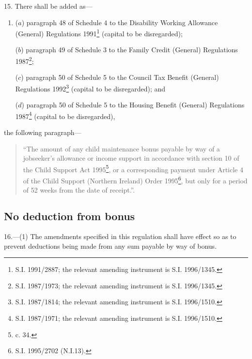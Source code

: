 \documentclass[a4paper]{article}
\begin{document}
15.  There shall be added as—
\begin{enumerate}\item[]
($a$) paragraph 48 of Schedule 4 to the Disability Working Allowance (General) Regulations 1991\footnote{\frenchspacing S.I. 1991/2887; the relevant amending instrument is S.I. 1996/1345.} (capital to be disregarded);

($b$) paragraph 49 of Schedule 3 to the Family Credit (General) Regulations 1987\footnote{\frenchspacing S.I. 1987/1973; the relevant amending instrument is S.I. 1996/1345.};

($c$) paragraph 50 of Schedule 5 to the Council Tax Benefit (General) Regulations 1992\footnote{\frenchspacing S.I. 1987/1814; the relevant amending instrument is S.I. 1996/1510.} (capital to be disregarded); and

($d$) paragraph 50 of Schedule 5 to the Housing Benefit (General) Regulations 1987\footnote{\frenchspacing S.I. 1987/1971; the relevant amending instrument is S.I. 1996/1510.} (capital to be disregarded),
\end{enumerate}
the following paragraph—
\begin{quotation}
“The amount of any child maintenance bonus payable by way of a jobseeker’s allowance or income support in accordance with section 10 of the Child Support Act 1995\footnote{ c. 34.}, or a corresponding payment under Article 4 of the Child Support (Northern Ireland) Order 1995\footnote{\frenchspacing S.I. 1995/2702 (N.I.13).}, but only for a period of 52 weeks from the date of receipt.”.
\end{quotation}

\subsection[16. No deduction from bonus]{No deduction from bonus}

16.—(1) The amendments specified in this regulation shall have effect so as to prevent deductions being made from any sum payable by way of bonus.
\end{document}
